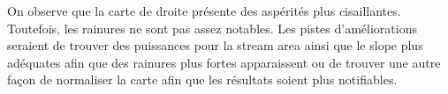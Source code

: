 \documentclass[11pt, letterpaper]{article}
\begin{document}
        On observe que la carte de droite présente des aspérités plus cisaillantes.
        Toutefois, les rainures ne sont pas assez notables. Les pistes d'améliorations seraient de trouver
        des puissances pour la stream area ainsi que le slope plus adéquates afin que des rainures plus fortes apparaissent
        ou de trouver une autre façon de normaliser la carte afin que les résultats soient plus notifiables.
        

        

        
\end{document}
